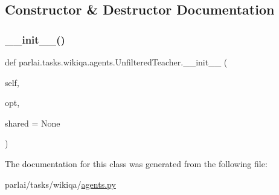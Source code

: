 \subsection{Constructor \& Destructor Documentation}
\mbox{\label{classparlai_1_1tasks_1_1wikiqa_1_1agents_1_1UnfilteredTeacher_a3f69b4069d4702ca92b2ce728f0e4ca4}} 
\subsubsection{\texorpdfstring{\+\_\+\+\_\+init\+\_\+\+\_\+()}{\_\_init\_\_()}}
{\footnotesize\ttfamily def parlai.\+tasks.\+wikiqa.\+agents.\+Unfiltered\+Teacher.\+\_\+\+\_\+init\+\_\+\+\_\+ (\begin{DoxyParamCaption}\item[{}]{self,  }\item[{}]{opt,  }\item[{}]{shared = {\ttfamily None} }\end{DoxyParamCaption})}



The documentation for this class was generated from the following file\+:\begin{DoxyCompactItemize}
\item 
parlai/tasks/wikiqa/\hyperlink{parlai_2tasks_2wikiqa_2agents_8py}{agents.\+py}\end{DoxyCompactItemize}
